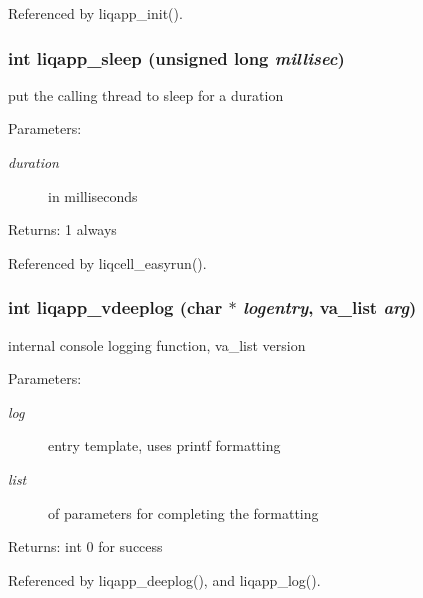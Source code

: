 Referenced by liqapp\_\-init().
\subsubsection[{liqapp\_\-sleep}]{\setlength{\rightskip}{0pt plus 5cm}int liqapp\_\-sleep (unsigned long {\em millisec})}\label{d7/dbc/liqapp_8c_73f7efd1a4442fdccedd9f6931f64cef}


put the calling thread to sleep for a duration \begin{Desc}
\item[Parameters:]
\begin{description}
\item[{\em duration}]in milliseconds \end{description}
\end{Desc}
\begin{Desc}
\item[Returns:]1 always \end{Desc}


Referenced by liqcell\_\-easyrun().
\subsubsection[{liqapp\_\-vdeeplog}]{\setlength{\rightskip}{0pt plus 5cm}int liqapp\_\-vdeeplog (char $\ast$ {\em logentry}, \/  va\_\-list {\em arg})}\label{d7/dbc/liqapp_8c_11b8d7fc997caa1851f6a280f04a6337}


internal console logging function, va\_\-list version \begin{Desc}
\item[Parameters:]
\begin{description}
\item[{\em log}]entry template, uses printf formatting \item[{\em list}]of parameters for completing the formatting \end{description}
\end{Desc}
\begin{Desc}
\item[Returns:]int 0 for success \end{Desc}


Referenced by liqapp\_\-deeplog(), and liqapp\_\-log().
